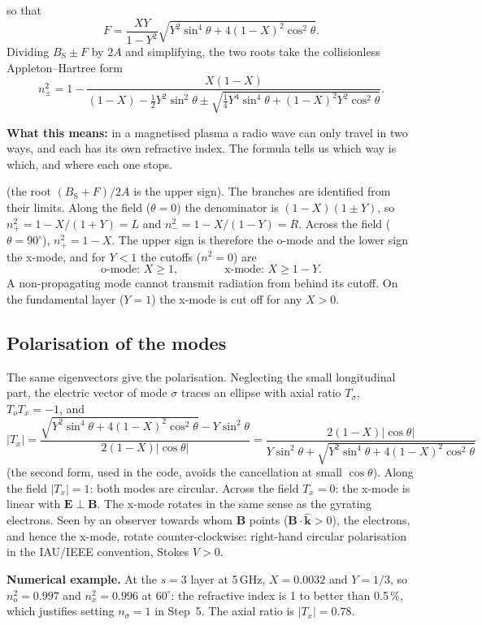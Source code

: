 \documentclass[11pt,a4paper]{article}
\newcommand{\vect}[1]{\bm{#1}}
\newcommand{\example}[1]{\par\noindent\colorbox{boxbg}{\parbox{\dimexpr\linewidth-2\fboxsep}{\small\textbf{Numerical example.} #1}}\par}
\newcommand{\whatitmeans}[1]{\par{\color{head}\textbf{What this means:}} #1\par}
\begin{document}
so that
\begin{equation}
  F=\frac{XY}{1-Y^2}\sqrt{Y^2\sin^4\theta+4(1-X)^2\cos^2\theta}.
\end{equation}
Dividing $B_\text{S}\pm F$ by $2A$ and simplifying, the two roots take the collisionless Appleton--Hartree form
\begin{equation}
  n_\pm^2=1-\frac{X(1-X)}{(1-X)-\tfrac12Y^2\sin^2\theta\pm\sqrt{\tfrac14Y^4\sin^4\theta+(1-X)^2Y^2\cos^2\theta}} .
  \label{eq:ah}
\end{equation}
\whatitmeans{in a magnetised plasma a radio wave can only travel in two ways, and each has its own
refractive index. The formula tells us which way is which, and where each one stops.}
(the root $(B_\text{S}+F)/2A$ is the upper sign). The branches are identified from their limits. Along the field ($\theta=0$) the denominator is
$(1-X)(1\pm Y)$, so $n_+^2=1-X/(1+Y)=L$ and $n_-^2=1-X/(1-Y)=R$. Across the field ($\theta=90^\circ$),
$n_+^2=1-X$. The upper sign is therefore the o-mode and the lower sign the x-mode, and for $Y<1$
the cutoffs ($n^2=0$) are
\begin{equation}
  \text{o-mode: } X\ge1,\qquad\qquad \text{x-mode: } X\ge1-Y .
\end{equation}
A non-propagating mode cannot transmit radiation from behind its cutoff. On the fundamental
layer ($Y=1$) the x-mode is cut off for any $X>0$.

\subsection{Polarisation of the modes}
The same eigenvectors give the polarisation. Neglecting the small longitudinal part, the electric
vector of mode $\sigma$ traces an ellipse with axial ratio $T_\sigma$, $T_oT_x=-1$, and
\begin{equation}
  |T_x|=\frac{\sqrt{Y^2\sin^4\theta+4(1-X)^2\cos^2\theta}-Y\sin^2\theta}{2(1-X)|\cos\theta|}
       =\frac{2(1-X)|\cos\theta|}{Y\sin^2\theta+\sqrt{Y^2\sin^4\theta+4(1-X)^2\cos^2\theta}}
\end{equation}
(the second form, used in the code, avoids the cancellation at small $\cos\theta$). Along the field
$|T_x|=1$: both modes are circular. Across the field $T_x=0$: the x-mode is linear with
$\vect E\perp\vect B$. The x-mode rotates in the same sense as the gyrating electrons. Seen by an
observer towards whom $\vect B$ points ($\vect B\cdot\hat{\vect k}>0$), the electrons, and hence the x-mode, rotate
counter-clockwise: right-hand circular polarisation in the IAU/IEEE convention, Stokes $V>0$.
\example{At the $s=3$ layer at 5\,GHz, $X=0.0032$ and $Y=1/3$, so $n^2_o=0.997$ and
$n^2_x=0.996$ at $60^\circ$: the refractive index is 1 to better than 0.5\,\%, which justifies setting
$n_\sigma=1$ in Step~5. The axial ratio is $|T_x|=0.78$.}
\end{document}
